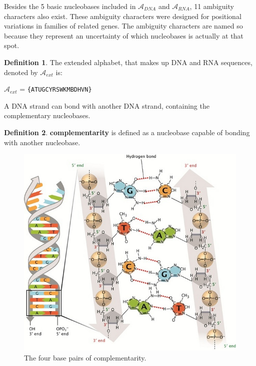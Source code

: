 \documentclass[12pt]{article}
\theoremstyle{definition}
\newtheorem{mydef}{Definition}
\begin{document}
Besides the 5 basic nucleobases included in $\mathcal{A}_{DNA}$ and $\mathcal{A}_{RNA}$, 11 ambiguity characters also exist.\cite{DNA-sciencedaily} These ambiguity characters were designed for positional variations in families of related genes. The ambiguity characters are named so because they represent  an uncertainty of which nucleobases is actually at that spot.

\begin{mydef}
The extended alphabet, that makes up DNA and RNA sequences, denoted by $\mathcal{A}_{ext}$ is:
\begin{center}
$\mathcal{A}_{ext}$ = \texttt{\{ATUGCYRSWKMBDHVN\}}
\end{center}
\end{mydef}

A DNA strand can bond with another DNA strand, containing the complementary nucleobases.

\begin{mydef}
\textbf{complementarity} is defined as a nucleobase capable of bonding with another nucleobase.
\end{mydef}

\begin{figure}[H]
	\label{Complementarity}
	\begin{center}
		\includegraphics[scale=2.5]{complementarity.jpg}	
	\end{center}
	\caption{The four base pairs of complementarity.\cite{DNA-nature}}
\end{figure}
\end{document}
